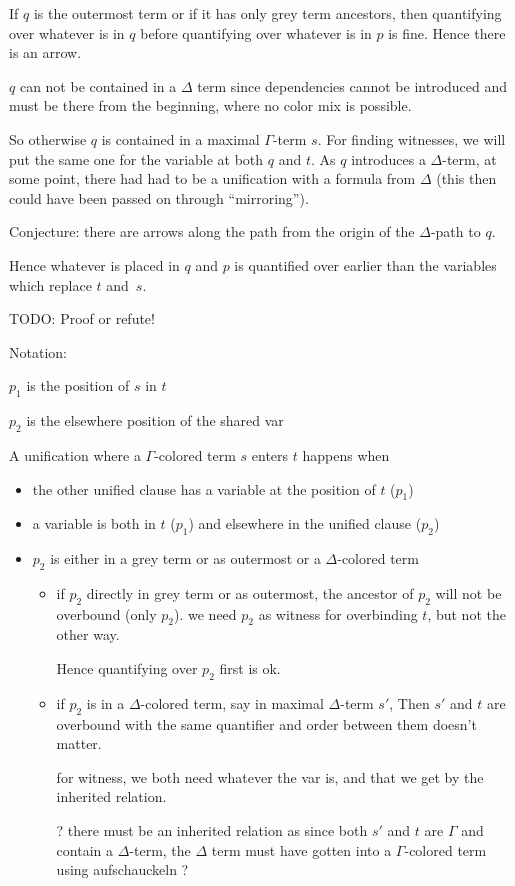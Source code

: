 \documentclass[,%
	paper=a4,%
	DIV14, 
	liststotoc,
	bibtotoc,
	draft=false,%
	numbers=noendperiod
]{scrartcl}
\begin{document}
	If $q$ is the outermost term or if it has only grey term ancestors, then quantifying over whatever is in $q$ before quantifying over whatever is in $p$ is fine. Hence there is an arrow.

	$q$ can not be contained in a $\Delta$ term since dependencies cannot be introduced and must be there from the beginning, where no color mix is possible.

	So otherwise $q$ is contained in a maximal $\Gamma$-term $s$. For finding witnesses, we will put the same one for the variable at both $q$ and $t$.
	As $q$ introduces a $\Delta$-term, at some point, there had had to be a unification with a formula from $\Delta$ (this then could have been passed on through ``mirroring'').

	Conjecture: there are arrows along the path from the origin of the $\Delta$-path to $q$.

	Hence whatever is placed in $q$ and $p$ is quantified over earlier than the variables which replace $t$ and~$s$.

	TODO: Proof or refute!




	\vspace{4em}

	Notation:

	$p_1$ is the position of $s$ in $t$

	$p_2$ is the elsewhere position of the shared var 


	A unification where a $\Gamma$-colored term $s$ enters $t$ happens when 

	\begin{itemize}
		\item the other unified clause has a variable at the position of $t$ ($p_1$)
		\item a variable is both in $t$ ($p_1$) and elsewhere in the unified clause ($p_2$)
		\item $p_2$ is either in a grey term or as outermost or a $\Delta$-colored term
			\begin{itemize}
				\item if $p_2$ directly in grey term or as outermost, the ancestor of $p_2$ will not be overbound (only $p_2$).
					we need $p_2$ as witness for overbinding $t$, but not the other way.

					Hence quantifying over $p_2$ first is ok.

				\item
					if $p_2$ is in a $\Delta$-colored term, say in maximal $\Delta$-term $s'$,
					Then $s'$ and $t$ are overbound with the same quantifier and order between them doesn't matter.

					for witness, we both need whatever the var is, and that we get by the inherited relation.

					? there must be an inherited relation as since both $s'$ and $t$ are $\Gamma$ and contain a $\Delta$-term, the $\Delta$ term must have gotten into a $\Gamma$-colored term using aufschauckeln ?
			\end{itemize}
	\end{itemize}
\end{document}
